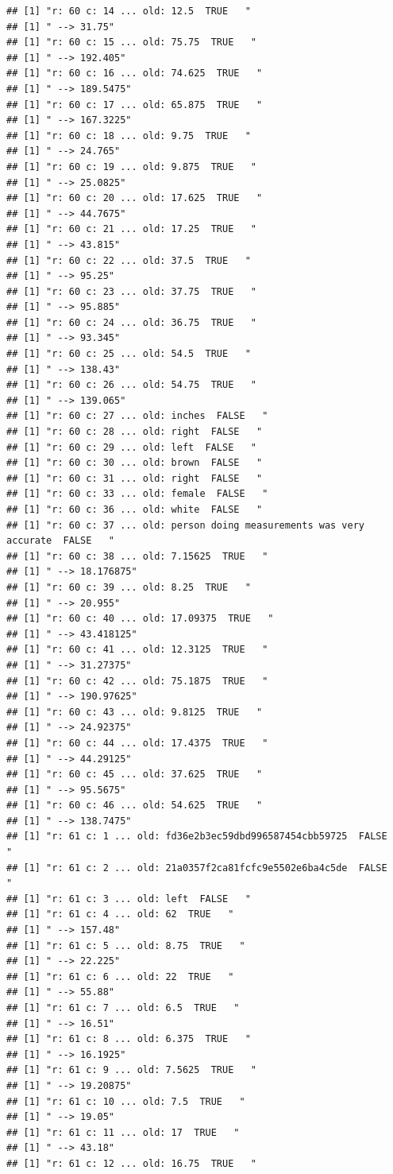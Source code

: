 \documentclass[]{article}
\begin{document}
\begin{verbatim}
## [1] "r: 60 c: 14 ... old: 12.5  TRUE   "
## [1] " --> 31.75"
## [1] "r: 60 c: 15 ... old: 75.75  TRUE   "
## [1] " --> 192.405"
## [1] "r: 60 c: 16 ... old: 74.625  TRUE   "
## [1] " --> 189.5475"
## [1] "r: 60 c: 17 ... old: 65.875  TRUE   "
## [1] " --> 167.3225"
## [1] "r: 60 c: 18 ... old: 9.75  TRUE   "
## [1] " --> 24.765"
## [1] "r: 60 c: 19 ... old: 9.875  TRUE   "
## [1] " --> 25.0825"
## [1] "r: 60 c: 20 ... old: 17.625  TRUE   "
## [1] " --> 44.7675"
## [1] "r: 60 c: 21 ... old: 17.25  TRUE   "
## [1] " --> 43.815"
## [1] "r: 60 c: 22 ... old: 37.5  TRUE   "
## [1] " --> 95.25"
## [1] "r: 60 c: 23 ... old: 37.75  TRUE   "
## [1] " --> 95.885"
## [1] "r: 60 c: 24 ... old: 36.75  TRUE   "
## [1] " --> 93.345"
## [1] "r: 60 c: 25 ... old: 54.5  TRUE   "
## [1] " --> 138.43"
## [1] "r: 60 c: 26 ... old: 54.75  TRUE   "
## [1] " --> 139.065"
## [1] "r: 60 c: 27 ... old: inches  FALSE   "
## [1] "r: 60 c: 28 ... old: right  FALSE   "
## [1] "r: 60 c: 29 ... old: left  FALSE   "
## [1] "r: 60 c: 30 ... old: brown  FALSE   "
## [1] "r: 60 c: 31 ... old: right  FALSE   "
## [1] "r: 60 c: 33 ... old: female  FALSE   "
## [1] "r: 60 c: 36 ... old: white  FALSE   "
## [1] "r: 60 c: 37 ... old: person doing measurements was very accurate  FALSE   "
## [1] "r: 60 c: 38 ... old: 7.15625  TRUE   "
## [1] " --> 18.176875"
## [1] "r: 60 c: 39 ... old: 8.25  TRUE   "
## [1] " --> 20.955"
## [1] "r: 60 c: 40 ... old: 17.09375  TRUE   "
## [1] " --> 43.418125"
## [1] "r: 60 c: 41 ... old: 12.3125  TRUE   "
## [1] " --> 31.27375"
## [1] "r: 60 c: 42 ... old: 75.1875  TRUE   "
## [1] " --> 190.97625"
## [1] "r: 60 c: 43 ... old: 9.8125  TRUE   "
## [1] " --> 24.92375"
## [1] "r: 60 c: 44 ... old: 17.4375  TRUE   "
## [1] " --> 44.29125"
## [1] "r: 60 c: 45 ... old: 37.625  TRUE   "
## [1] " --> 95.5675"
## [1] "r: 60 c: 46 ... old: 54.625  TRUE   "
## [1] " --> 138.7475"
## [1] "r: 61 c: 1 ... old: fd36e2b3ec59dbd996587454cbb59725  FALSE   "
## [1] "r: 61 c: 2 ... old: 21a0357f2ca81fcfc9e5502e6ba4c5de  FALSE   "
## [1] "r: 61 c: 3 ... old: left  FALSE   "
## [1] "r: 61 c: 4 ... old: 62  TRUE   "
## [1] " --> 157.48"
## [1] "r: 61 c: 5 ... old: 8.75  TRUE   "
## [1] " --> 22.225"
## [1] "r: 61 c: 6 ... old: 22  TRUE   "
## [1] " --> 55.88"
## [1] "r: 61 c: 7 ... old: 6.5  TRUE   "
## [1] " --> 16.51"
## [1] "r: 61 c: 8 ... old: 6.375  TRUE   "
## [1] " --> 16.1925"
## [1] "r: 61 c: 9 ... old: 7.5625  TRUE   "
## [1] " --> 19.20875"
## [1] "r: 61 c: 10 ... old: 7.5  TRUE   "
## [1] " --> 19.05"
## [1] "r: 61 c: 11 ... old: 17  TRUE   "
## [1] " --> 43.18"
## [1] "r: 61 c: 12 ... old: 16.75  TRUE   "

\end{verbatim}
\end{document}
